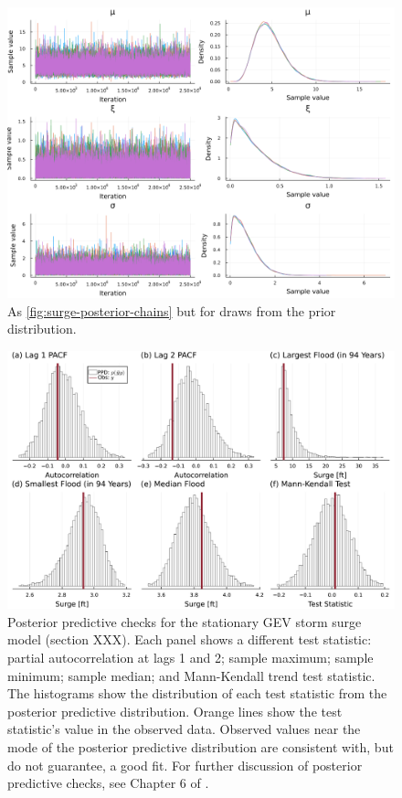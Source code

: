 \documentclass[12pt]{article}
\begin{document}
\begin{figure}
    \centering
    \includegraphics[width=\textwidth]{surge-prior-chains}
    \caption{
        As \cref{fig:surge-posterior-chains} but for draws from the prior distribution.
    }\label{fig:surge-prior-chains}
\end{figure}

\begin{figure}
    \centering
    \includegraphics[width=\textwidth]{surge-test-statistics}
    \caption{
        Posterior predictive checks for the stationary GEV storm surge model (section XXX). %
        Each panel shows a different test statistic: partial autocorrelation at lags 1 and 2; sample maximum; sample minimum; sample median; and Mann-Kendall trend test statistic.
        The histograms show the distribution of each test statistic from the posterior predictive distribution.
        Orange lines show the test statistic's value in the observed data.
        Observed values near the mode of the posterior predictive distribution are consistent with, but do not guarantee, a good fit.
        For further discussion of posterior predictive checks, see Chapter 6 of \citet{Gelman:2014tc}.
    }\label{fig:surge-test-statistics}
\end{figure}
\end{document}
